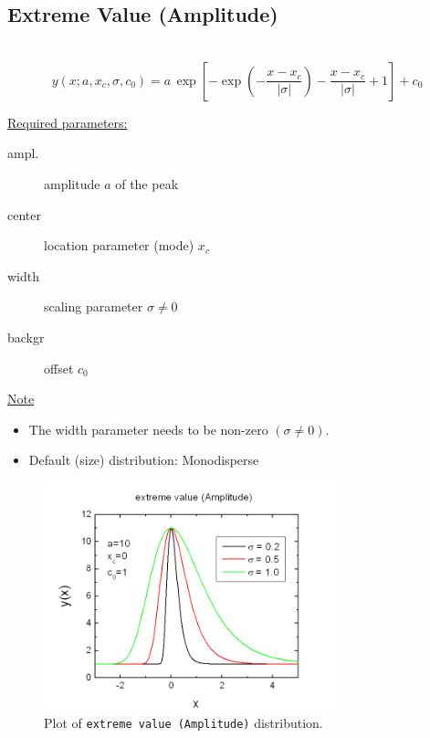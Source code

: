 \subsection{Extreme Value (Amplitude)} \hspace{1pt} \\
\label{sec:ExtremeValueAmplitude}
\begin{equation}
y(x;a,x_c,\sigma,c_0) = a \,
\exp\left[-\exp\left(-\frac{x-x_c}{|\sigma|}\right)-\frac{x-x_c}{|\sigma|}+1\right]
+c_0
\end{equation}
\vspace{5mm}

\uline{Required parameters:}
\begin{description}
    \item[ampl.] amplitude $a$ of the peak
    \item[center] location parameter (mode) $x_c$
    \item[width] scaling parameter $\sigma\neq 0$
    \item[backgr] offset $c_0$
\end{description}

\uline{Note}
\begin{itemize}
  \item The width parameter needs to be non-zero $(\sigma\neq 0)$.
  \item Default (size) distribution: Monodisperse
\end{itemize}
\begin{figure}[htb]
\begin{center}
\includegraphics[width=0.768\textwidth]{ExtremeValueAmplitude.png}
\end{center}
\caption{Plot of \texttt{extreme value (Amplitude)} distribution.}
\label{fig:ExtremeValueAmplitude}
\end{figure}

